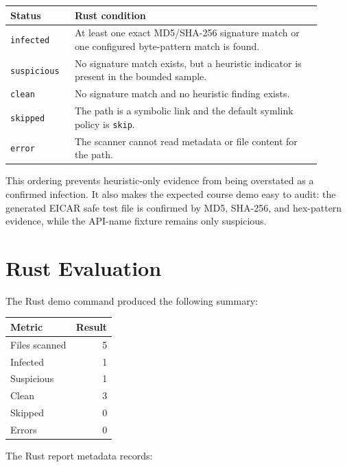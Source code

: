 \documentclass[11pt]{article}
\begin{document}
\begin{longtable}{p{0.18\linewidth}p{0.72\linewidth}}
\toprule
\textbf{Status} & \textbf{Rust condition} \\
\midrule
\texttt{infected} & At least one exact MD5/SHA-256 signature match or one
configured byte-pattern match is found. \\
\texttt{suspicious} & No signature match exists, but a heuristic indicator is
present in the bounded sample. \\
\texttt{clean} & No signature match and no heuristic finding exists. \\
\texttt{skipped} & The path is a symbolic link and the default symlink policy is
\texttt{skip}. \\
\texttt{error} & The scanner cannot read metadata or file content for the path. \\
\bottomrule
\end{longtable}

This ordering prevents heuristic-only evidence from being overstated as a
confirmed infection. It also makes the expected course demo easy to audit:
the generated EICAR safe test file is confirmed by MD5, SHA-256, and
hex-pattern evidence, while the API-name fixture remains only suspicious.

\section{Rust Evaluation}

The Rust demo command produced the following summary:

\begin{center}
\begin{tabular}{lr}
\toprule
\textbf{Metric} & \textbf{Result} \\
\midrule
Files scanned & 5 \\
Infected & 1 \\
Suspicious & 1 \\
Clean & 3 \\
Skipped & 0 \\
Errors & 0 \\
\bottomrule
\end{tabular}
\end{center}

The Rust report metadata records:
\end{document}
